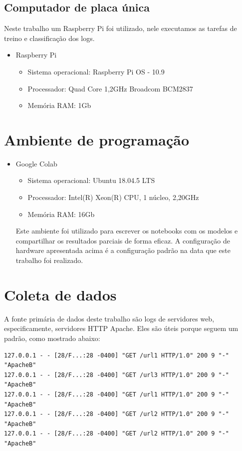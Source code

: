 \subsection{Computador de placa única}

Neste trabalho um Raspberry Pi foi utilizado, nele executamos as tarefas de treino e classificação
dos logs.

\begin{itemize}
    \item Raspberry Pi
        \begin{itemize}
            \item Sistema operacional: Raspberry Pi OS - 10.9
            \item Processador: Quad Core 1,2GHz Broadcom BCM2837
            \item Memória RAM: 1Gb
        \end{itemize}
\end{itemize}

\section{Ambiente de programação}
\begin{itemize}
    \item Google Colab
        \begin{itemize}
            \item Sistema operacional: Ubuntu 18.04.5 LTS
            \item Processador: Intel(R) Xeon(R) CPU, 1 núcleo, 2,20GHz
            \item Memória RAM: 16Gb
        \end{itemize} 
        Este ambiente foi utilizado para escrever os notebooks com os modelos e compartilhar os resultados
        parciais de forma eficaz. A configuração de hardware apresentada acima é a configuração padrão na data 
        que este trabalho foi realizado.
\end{itemize}

\section{Coleta de dados}

A fonte primária de dados deste trabalho são logs de servidores web, especificamente,
servidores HTTP Apache. Eles são úteis porque seguem um padrão, como mostrado abaixo:

\begin{verbatim}
127.0.0.1 - - [28/F...:28 -0400] "GET /url1 HTTP/1.0" 200 9 "-" "ApacheB"
127.0.0.1 - - [28/F...:28 -0400] "GET /url3 HTTP/1.0" 200 9 "-" "ApacheB"
127.0.0.1 - - [28/F...:28 -0400] "GET /url1 HTTP/1.0" 200 9 "-" "ApacheB"
127.0.0.1 - - [28/F...:28 -0400] "GET /url2 HTTP/1.0" 200 9 "-" "ApacheB"
127.0.0.1 - - [28/F...:28 -0400] "GET /url2 HTTP/1.0" 200 9 "-" "ApacheB"
\end{verbatim}

